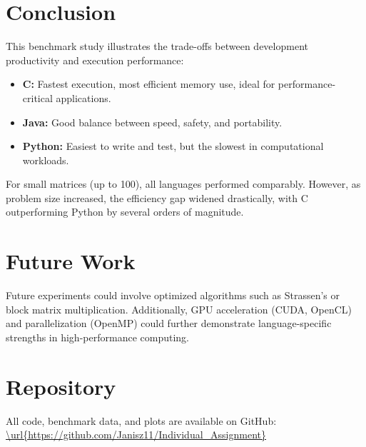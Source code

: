 \documentclass[12pt,a4paper]{article}
\begin{document}
\section{Conclusion}
This benchmark study illustrates the trade-offs between development productivity and execution performance:
\begin{itemize}
  \item \textbf{C:} Fastest execution, most efficient memory use, ideal for performance-critical applications.
  \item \textbf{Java:} Good balance between speed, safety, and portability.
  \item \textbf{Python:} Easiest to write and test, but the slowest in computational workloads.
\end{itemize}
For small matrices (up to 100), all languages performed comparably. However, as problem size increased, the efficiency gap widened drastically, with C outperforming Python by several orders of magnitude.

\section{Future Work}
Future experiments could involve optimized algorithms such as Strassen’s or block matrix multiplication. Additionally, GPU acceleration (CUDA, OpenCL) and parallelization (OpenMP) could further demonstrate language-specific strengths in high-performance computing.

\section{Repository}
All code, benchmark data, and plots are available on GitHub:  
\url{\url{https://github.com/Janisz11/Individual_Assignment}}
\end{document}

